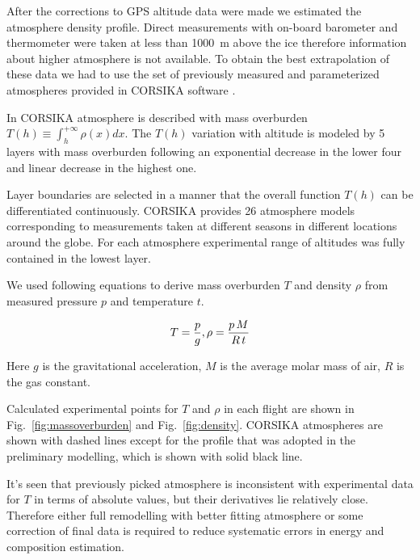 \documentclass[final,5p,times,twocolumn]{elsarticle}
\begin{document}
After the corrections to GPS altitude data were made we estimated the atmosphere density profile. Direct measurements with on-board barometer and thermometer were taken at less than 1000~m above the ice therefore information about higher atmosphere is not available. To obtain the best extrapolation of these data we had to use the set of previously measured and parameterized atmospheres provided in CORSIKA software \cite{hec98}.

In CORSIKA atmosphere is described with mass overburden $T(h) \equiv \int_{h}^{+\infty} \rho(x) dx$. The $T(h)$ variation with altitude is modeled by 5 layers with mass overburden following an exponential decrease in the lower four and linear decrease in the highest one.


Layer boundaries are selected in a manner that the overall function $T(h)$ can be differentiated continuously. CORSIKA provides 26 atmosphere models corresponding to measurements taken at different seasons in different locations around the globe. For each atmosphere experimental range of altitudes was fully contained in the lowest layer.

We used following equations to derive mass overburden $T$ and density $\rho$ from measured pressure $p$ and temperature $t$.

\begin{equation}
T     = \frac{p}{g}, \\
\rho  = \frac{p \, M}{R \, t} \\
\end{equation}

Here $g$ is the gravitational acceleration, $M$ is the average molar mass of air, $R$ is the gas constant.

Calculated experimental points for $T$ and $\rho$ in each flight are shown in Fig.~\ref{fig:massoverburden} and Fig.~\ref{fig:density}. CORSIKA atmospheres are shown with dashed lines except for the profile that was adopted in the preliminary modelling, which is shown with solid black line.

It's seen that previously picked atmosphere is inconsistent with experimental data for $T$ in terms of absolute values, but their derivatives lie relatively close. Therefore either full remodelling with better fitting atmosphere or some correction of final data is required to reduce systematic errors in energy and composition estimation.
\end{document}
